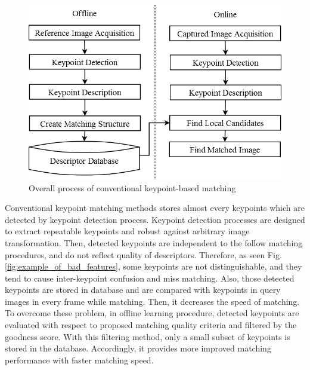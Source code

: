 \begin{figure}[hb!]
\centering
\includegraphics[width=1.0\columnwidth]{1_introduction/process}
\caption{Overall process of conventional keypoint-based matching}
\label{fig:on_offline_process}
\end{figure}

Conventional keypoint matching methods stores almost every keypoints which are detected by keypoint detection process. Keypoint detection processes are designed to extract repeatable keypoints and robust against arbitrary image transformation. Then, detected keypoints are independent to the follow matching procedures, and do not reflect quality of descriptors. Therefore, as seen Fig. \ref{fig:example_of_bad_features}, some keypoints are not distinguishable, and they tend to cause inter-keypoint confusion and miss matching. Also, those detected keypoints are stored in database and are compared with keypoints in query images in every frame while matching. Then, it decreases the speed of matching. To overcome these problem, in offline learning procedure, detected keypoints are evaluated with respect to proposed matching quality criteria and filtered by the goodness score. With this filtering method, only a small subset of keypoints is stored in the database. Accordingly, it provides more improved matching performance with faster matching speed.

